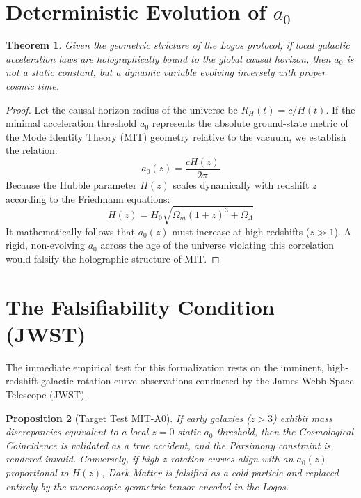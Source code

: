 \documentclass[12pt, a4paper]{article}
\theoremstyle{plain}
\newtheorem{theorem}{Theorem}[section]
\newtheorem{proposition}[theorem]{Proposition}
\theoremstyle{definition}
\theoremstyle{remark}
\begin{document}
\section{Deterministic Evolution of $a_0$}\label{sec:evolution}

\begin{theorem}
Given the geometric stricture of the Logos protocol, if local galactic acceleration laws are holographically bound to the global causal horizon, then $a_0$ is not a static constant, but a dynamic variable evolving inversely with proper cosmic time.
\end{theorem}

\begin{proof}
Let the causal horizon radius of the universe be $R_H(t) = c / H(t)$. If the minimal acceleration threshold $a_0$ represents the absolute ground-state metric of the Mode Identity Theory (MIT) geometry relative to the vacuum, we establish the relation:
\begin{equation}
    a_0(z) = \frac{c H(z)}{2 \pi}
\end{equation}
Because the Hubble parameter $H(z)$ scales dynamically with redshift $z$ according to the Friedmann equations:
\begin{equation}
    H(z) = H_0 \sqrt{\Omega_m(1+z)^3 + \Omega_\Lambda}
\end{equation}
It mathematically follows that $a_0(z)$ must increase at high redshifts ($z \gg 1$). A rigid, non-evolving $a_0$ across the age of the universe violating this correlation would falsify the holographic structure of MIT.
\end{proof}

\section{The Falsifiability Condition (JWST)}\label{sec:jwst}

The immediate empirical test for this formalization rests on the imminent, high-redshift galactic rotation curve observations conducted by the James Webb Space Telescope (JWST). 

\begin{proposition}[Target Test MIT-A0]
If early galaxies ($z > 3$) exhibit mass discrepancies equivalent to a local $z=0$ static $a_0$ threshold, then the Cosmological Coincidence is validated as a true accident, and the Parsimony constraint is rendered invalid. Conversely, if high-$z$ rotation curves align with an $a_0(z)$ proportional to $H(z)$, Dark Matter is falsified as a cold particle and replaced entirely by the macroscopic geometric tensor encoded in the Logos.
\end{proposition}
\end{document}
